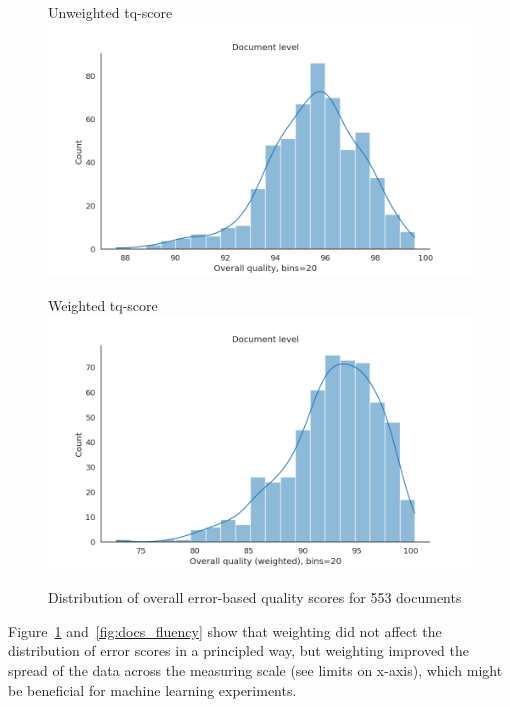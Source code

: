 \begin{figure}[H]
	\begin{minipage}[c]{0.45\linewidth}
		\centering
		Unweighted tq-score
		\includegraphics[width=\linewidth]{figures/err/doc-tq-noweights.png}
	\end{minipage}
	\begin{minipage}[c]{0.45\linewidth}
		\centering
		Weighted tq-score
		\includegraphics[width=\linewidth]{figures/err/doc-tq-major2critical5weighted.png}
	\end{minipage}	
	\caption{\label{fig:tq}Distribution of overall error-based quality scores for 553 documents}	
\end{figure}

Figure~\ref{fig:tq} and~\ref{fig:docs_fluency} show that weighting did not affect the distribution of error scores in a principled way, but weighting improved the spread of the data across the measuring scale (see limits on x-axis), which might be beneficial for machine learning experiments.

